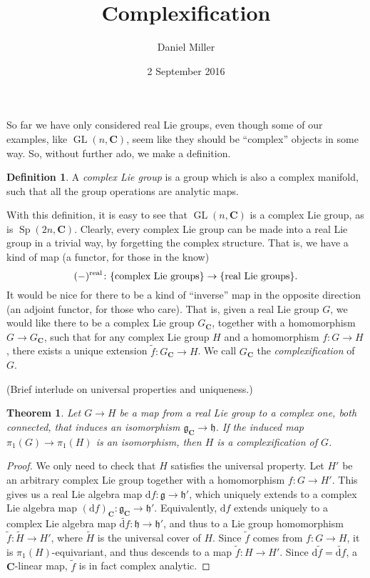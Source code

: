 \documentclass{article}
\title{Complexification}
\author{Daniel Miller}
\date{2 September 2016}
\DeclareMathOperator{\GL}{GL}
\DeclareMathOperator{\Sp}{Sp}
\newcommand{\bC}{{\mathbf C}}
\newcommand{\fg}{{\mathfrak g}}
\newcommand{\fh}{{\mathfrak h}}
\newcommand{\dd}{\mathrm{d}}
\newcommand{\real}{\mathrm{real}}
\newtheorem{theorem}{Theorem}
\theoremstyle{definition}
\newtheorem{definition}{Definition}
\begin{document}
\maketitle





So far we have only considered real Lie groups, even though some of our 
examples, like $\GL(n,\bC)$, seem like they should be ``complex'' objects in 
some way. So, without further ado, we make a definition. 

\begin{definition}
A \emph{complex Lie group} is a group which is also a complex manifold, such 
that all the group operations are analytic maps.  
\end{definition}

With this definition, it is easy to see that $\GL(n,\bC)$ is a complex Lie 
group, as is $\Sp(2n,\bC)$. Clearly, every complex Lie group can be made into 
a real Lie group in a trivial way, by forgetting the complex structure. That 
is, we have a kind of map (a functor, for those in the know)
\[
	(-)^\real \colon \{\textnormal{complex Lie groups}\} \to \{\textnormal{real Lie groups}\} .
\]
It would be nice for there to be a kind of ``inverse'' map in the opposite 
direction (an adjoint functor, for those who care). That is, given a real Lie 
group $G$, we would like there to be a complex Lie group $G_\bC$, together 
with a homomorphism $G\to G_\bC$, such that for any complex Lie group $H$ and 
a homomorphism $f\colon G\to H$, there exists a unique extension 
$\widetilde f\colon G_\bC \to H$. We call $G_\bC$ the \emph{complexification} 
of $G$. 

(Brief interlude on universal properties and uniqueness.)

\begin{theorem}
Let $G\to H$ be a map from a real Lie group to a complex one, both connected, 
that induces an isomorphism $\fg_\bC \to \fh$. If the induced map 
$\pi_1(G) \to \pi_1(H)$ is an isomorphism, then $H$ is a complexification of 
$G$. 
\end{theorem}
\begin{proof}
We only need to check that $H$ satisfies the universal property. Let 
$H'$ be an arbitrary complex Lie group together with a homomorphism 
$f\colon G\to H'$. This gives us a real Lie algebra map 
$\dd f\colon \fg \to \fh'$, which uniquely extends to a complex Lie algebra 
map $(\dd f)_\bC\colon \fg_\bC\to \fh'$. Equivalently, $\dd f$ extends uniquely 
to a complex Lie algebra map $\widetilde{\dd f}\colon \fh\to \fh'$, and thus 
to a Lie group homomorphism $\widetilde f\colon \widetilde H\to H'$, where 
$\widetilde H$ is the universal cover of $H$. Since $\widetilde f$ comes 
from $f\colon G\to H$, it is $\pi_1(H)$-equivariant, and thus descends to a 
map $\widetilde f\colon H\to H'$. Since 
$\dd \widetilde f = \widetilde{\dd f}$, a $\bC$-linear map, $\widetilde f$ is 
in fact complex analytic. 
\end{proof}
\end{document}
